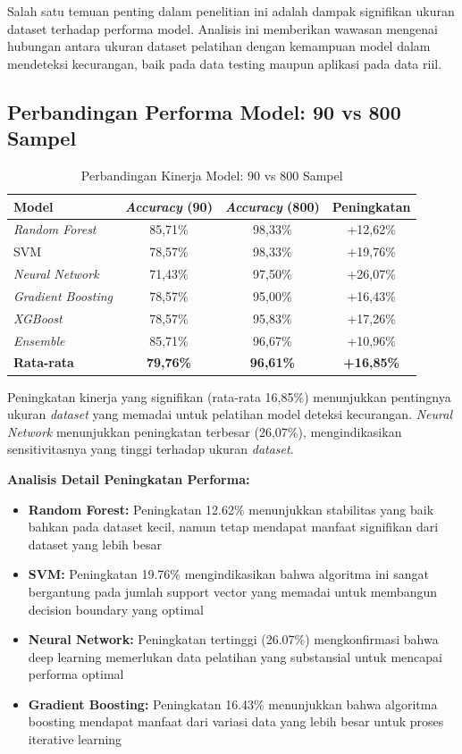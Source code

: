 Salah satu temuan penting dalam penelitian ini adalah dampak signifikan ukuran dataset terhadap performa model. Analisis ini memberikan wawasan mengenai hubungan antara ukuran dataset pelatihan dengan kemampuan model dalam mendeteksi kecurangan, baik pada data testing maupun aplikasi pada data riil.

\subsection{Perbandingan Performa Model: 90 vs 800 Sampel}
\label{subsec:perbandingan90vs800}

\begin{table}[htbp]
\centering
\caption{Perbandingan Kinerja Model: 90 vs 800 Sampel}
\label{tabel:perbandingan90vs800}
\begin{tabular}{|l|c|c|c|}
\hline
\textbf{Model} & \textbf{\textit{Accuracy} (90)} & \textbf{\textit{Accuracy} (800)} & \textbf{Peningkatan} \\
\hline
\textit{Random Forest} & 85,71\% & 98,33\% & +12,62\% \\
\hline
SVM & 78,57\% & 98,33\% & +19,76\% \\
\hline
\textit{Neural Network} & 71,43\% & 97,50\% & +26,07\% \\
\hline
\textit{Gradient Boosting} & 78,57\% & 95,00\% & +16,43\% \\
\hline
\textit{XGBoost} & 78,57\% & 95,83\% & +17,26\% \\
\hline
\textit{Ensemble} & 85,71\% & 96,67\% & +10,96\% \\
\hline
\textbf{Rata-rata} & \textbf{79,76\%} & \textbf{96,61\%} & \textbf{+16,85\%} \\
\hline
\end{tabular}
\end{table}

Peningkatan kinerja yang signifikan (rata-rata 16,85\%) menunjukkan pentingnya ukuran \textit{dataset} yang memadai untuk pelatihan model deteksi kecurangan. \textit{Neural Network} menunjukkan peningkatan terbesar (26,07\%), mengindikasikan sensitivitasnya yang tinggi terhadap ukuran \textit{dataset}.

\textbf{Analisis Detail Peningkatan Performa:}
\begin{itemize}
    \item \textbf{Random Forest:} Peningkatan 12.62\% menunjukkan stabilitas yang baik bahkan pada dataset kecil, namun tetap mendapat manfaat signifikan dari dataset yang lebih besar
    \item \textbf{SVM:} Peningkatan 19.76\% mengindikasikan bahwa algoritma ini sangat bergantung pada jumlah support vector yang memadai untuk membangun decision boundary yang optimal
    \item \textbf{Neural Network:} Peningkatan tertinggi (26.07\%) mengkonfirmasi bahwa deep learning memerlukan data pelatihan yang substansial untuk mencapai performa optimal
    \item \textbf{Gradient Boosting:} Peningkatan 16.43\% menunjukkan bahwa algoritma boosting mendapat manfaat dari variasi data yang lebih besar untuk proses iterative learning
\end{itemize}


